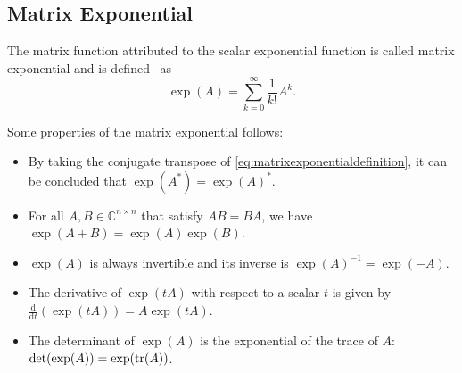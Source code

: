 \subsection{Matrix Exponential}
The matrix function attributed to the scalar exponential function is called
matrix exponential and is defined~\cite{higham2008functions} as
\begin{equation}
    \label{eq:matrixexponentialdefinition}
    \exp(A) = \sum_{k=0}^{\infty}{\frac{1}{k!} A^k}.
\end{equation}

Some properties of the matrix exponential follows:
\begin{itemize}
    \item By taking the conjugate transpose of \eqref{eq:matrixexponentialdefinition},
        it can be concluded that $\exp(A^{*}) = \exp(A)^{*}$.
    \item For all $A, B \in \mathbb{C}^{n \times n}$ that satisfy $AB = BA$,
        we have $\exp(A + B) = \exp(A) \exp(B)$.
    \item $\exp(A)$ is always invertible and its inverse is $\exp(A)^{-1} = \exp(-A)$.
    \item The derivative of $\exp(tA)$ with respect to a scalar $t$ is given by
        $\frac{\mathrm{d}}{\mathrm{d} t} (\exp(tA)) = A \exp(tA)$.
    \item The determinant of $\exp(A)$ is the exponential of the trace of
        $A$: $\det(\exp(A)) = \exp(\trace(A))$.
\end{itemize}

